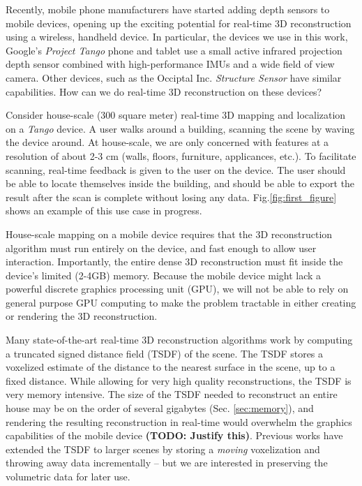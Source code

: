 \documentclass[10pt,twocolumn,letterpaper]{article}
\newcommand{\figref}[1]{Fig.\ref{#1}}
\begin{document}
Recently, mobile phone manufacturers have started adding
depth sensors to mobile devices, opening up the exciting potential for
real-time 3D reconstruction using a wireless, handheld device. In particular,
the devices we use in this work, Google's \textit{Project Tango} \cite{Tango}
phone and tablet use a small active infrared projection depth  sensor combined
with high-performance IMUs and a wide field of view camera. Other devices, such
as the Occiptal Inc. \textit{Structure Sensor} \cite{StructureSensor} have
similar capabilities. How can we do real-time 3D reconstruction on these devices?

Consider house-scale (300 square meter) real-time 3D mapping and localization on
a \textit{Tango} device.  A user walks around a building, scanning the scene by
waving the device around. At house-scale, we are only concerned with features
at a resolution of about 2-3 cm (walls, floors, furniture, applicances, etc.).
To facilitate scanning, real-time feedback is given to the user on the device.
The user should be able to locate themselves inside the building, and should be
able to export the result after the scan is complete without losing any data.
\figref{fig:first_figure} shows an example of this use case in progress.

House-scale mapping on a mobile device requires that the 3D reconstruction
algorithm must run entirely on the device, and fast enough to allow user
interaction. Importantly, the entire dense 3D reconstruction must fit inside
the device's limited (2-4GB) memory. Because the mobile device might lack a
powerful discrete graphics processing unit (GPU), we will not be able to rely
on general purpose GPU computing to make the problem tractable in either
creating or rendering the 3D reconstruction.

Many state-of-the-art real-time 3D reconstruction algorithms \cite{Newcombe,
Whelan2013, WhelanLoopClose, Bylow2013} work by computing a truncated signed
distance field (TSDF) \cite{Curless1996} of the scene. The TSDF stores a
voxelized estimate of the distance to the nearest surface in the scene, up to a
fixed distance. While allowing for very high quality reconstructions, the TSDF
is very memory intensive. The size of the TSDF needed to reconstruct an entire
house may be on the order of several gigabytes  (Sec. \ref{sec:memory}), and
rendering the resulting reconstruction in real-time would overwhelm the graphics
capabilities of the mobile device \textbf{(TODO: Justify this)}. Previous works
\cite{Whelan2013, WhelanLoopClose} have extended the TSDF to larger scenes by
storing a \textit{moving} voxelization and throwing away data incrementally --
but we are interested in preserving the volumetric data for later use.
\end{document}
